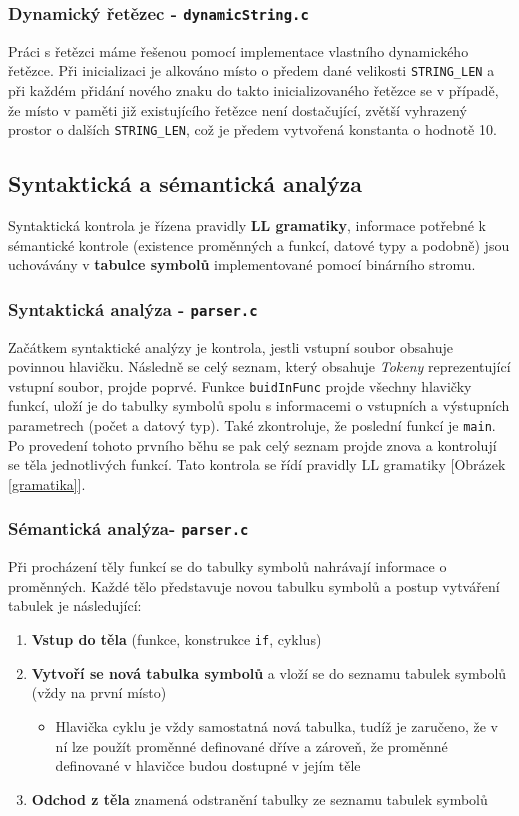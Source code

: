 \documentclass[czech,a4paper,12pt]{article}[]
\begin{document}
\subsubsection{Dynamický řetězec - \texttt{dynamicString.c}} 
Práci s řetězci máme řešenou pomocí implementace vlastního dynamického řetězce. Při inicializaci je alkováno místo o předem dané velikosti \texttt{STRING\_LEN} a při každém přidání nového znaku do takto inicializovaného řetězce se v případě, že místo v paměti již existujícího řetězce není dostačující, zvětší vyhrazený prostor o dalších \texttt{STRING\_LEN}, což je předem vytvořená konstanta o hodnotě 10.

\subsection{Syntaktická a sémantická analýza}
Syntaktická kontrola je řízena pravidly \textbf{LL gramatiky}, informace potřebné k sémantické kontrole (existence proměnných a funkcí, datové typy a podobně) jsou uchovávány v \textbf{tabulce symbolů} implementované pomocí binárního stromu. 


\subsubsection{Syntaktická analýza - \texttt{parser.c}}
Začátkem syntaktické analýzy je kontrola, jestli vstupní soubor obsahuje povinnou hlavičku. Následně se celý seznam, který obsahuje \emph{Tokeny} reprezentující vstupní soubor, projde poprvé. Funkce \texttt{buidInFunc} projde všechny hlavičky funkcí, uloží je do tabulky symbolů spolu s informacemi o vstupních a výstupních parametrech (počet a datový typ). Také zkontroluje, že poslední funkcí je \texttt{main}. Po provedení tohoto prvního běhu se pak celý seznam projde znova a kontrolují se těla jednotlivých funkcí. Tato kontrola se řídí pravidly LL gramatiky [Obrázek \ref{gramatika}].

\subsubsection{Sémantická analýza- \texttt{parser.c}}
Při procházení těly funkcí se do tabulky symbolů nahrávají informace o proměnných. Každé tělo představuje novou tabulku symbolů a postup vytváření tabulek je následující:

\begin{enumerate}
    \item \textbf{Vstup do těla} (funkce, konstrukce \texttt{if}, cyklus)
    \item \textbf{Vytvoří se nová tabulka symbolů} a vloží se do seznamu tabulek symbolů (vždy na první místo)
    \begin{itemize}
        \item Hlavička cyklu je vždy samostatná nová tabulka, tudíž je zaručeno, že v ní lze použít proměnné definované dříve a zároveň, že proměnné definované v hlavičce budou dostupné v jejím těle
    \end{itemize}
    \item \textbf{Odchod z těla} znamená odstranění tabulky ze seznamu tabulek symbolů
\end{enumerate}
\end{document}
